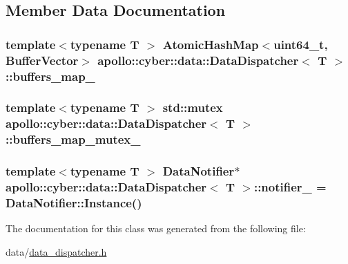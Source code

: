 \subsection{Member Data Documentation}
\hypertarget{classapollo_1_1cyber_1_1data_1_1DataDispatcher_ad7468b681e765b85516f17a34553eece}{
\subsubsection[{buffers\-\_\-map\-\_\-}]{\setlength{\rightskip}{0pt plus 5cm}template$<$typename T $>$ {\bf Atomic\-Hash\-Map}$<$uint64\-\_\-t, {\bf Buffer\-Vector}$>$ {\bf apollo\-::cyber\-::data\-::\-Data\-Dispatcher}$<$ T $>$\-::buffers\-\_\-map\-\_\-\hspace{0.3cm}{\ttfamily [private]}}}\label{classapollo_1_1cyber_1_1data_1_1DataDispatcher_ad7468b681e765b85516f17a34553eece}
\hypertarget{classapollo_1_1cyber_1_1data_1_1DataDispatcher_ad6c0557358e14fb05e07a04cf3e026cb}{
\subsubsection[{buffers\-\_\-map\-\_\-mutex\-\_\-}]{\setlength{\rightskip}{0pt plus 5cm}template$<$typename T $>$ std\-::mutex {\bf apollo\-::cyber\-::data\-::\-Data\-Dispatcher}$<$ T $>$\-::buffers\-\_\-map\-\_\-mutex\-\_\-\hspace{0.3cm}{\ttfamily [private]}}}\label{classapollo_1_1cyber_1_1data_1_1DataDispatcher_ad6c0557358e14fb05e07a04cf3e026cb}
\hypertarget{classapollo_1_1cyber_1_1data_1_1DataDispatcher_a171868a783ef9a7fb75739c9910b5157}{
\subsubsection[{notifier\-\_\-}]{\setlength{\rightskip}{0pt plus 5cm}template$<$typename T $>$ {\bf Data\-Notifier}$\ast$ {\bf apollo\-::cyber\-::data\-::\-Data\-Dispatcher}$<$ T $>$\-::notifier\-\_\- = Data\-Notifier\-::\-Instance()\hspace{0.3cm}{\ttfamily [private]}}}\label{classapollo_1_1cyber_1_1data_1_1DataDispatcher_a171868a783ef9a7fb75739c9910b5157}


The documentation for this class was generated from the following file\-:\begin{DoxyCompactItemize}
\item 
data/\hyperlink{data__dispatcher_8h}{data\-\_\-dispatcher.\-h}\end{DoxyCompactItemize}
